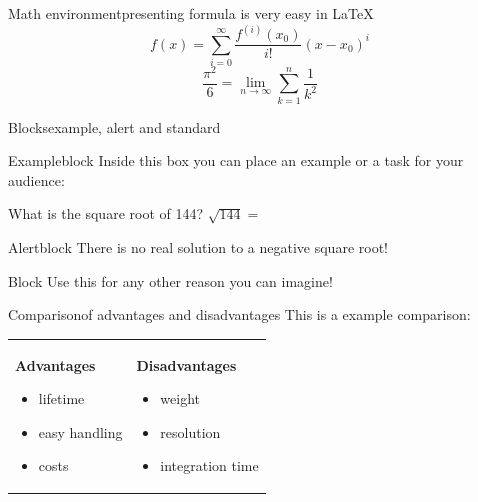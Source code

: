 \documentclass[	12pt, 				
				t,					
				aspectratio=169,
				]{beamer}
\begin{document}
	
	
	\begin{frame}{Math environment}{presenting formula is very easy in \LaTeX}
		\vfill
		\begin{equation*}
			f(x)=\sum_{i=0}^\infty \frac{f^{(i)}(x_0)}{i!}(x-x_0)^i
		\end{equation*}
		\vfill
		\begin{equation*}
			\displaystyle\frac{\pi^2}{6}=\lim_{n \to \infty}\sum_{k=1}^n \frac{1}{k^2}
		\end{equation*}
		\vfill
	\end{frame}
	
	
	\begin{frame}{Blocks}{example, alert and standard}
	    \begin{exampleblock}{Exampleblock}
			Inside this box you can place an example or a task for your audience:
			
			What is the square root of 144? $\sqrt{144} = $
		\end{exampleblock}
		\begin{alertblock}{Alertblock}			
			There is no real solution to a negative square root!
		\end{alertblock}
		\begin{block}{Block}
			Use this for any other reason you can imagine!
		\end{block}
	\end{frame}
	
	
	\begin{frame}{Comparison}{of advantages and disadvantages}
		This is a example comparison:
		\begin{center}
		\begin{tabularx}{0.8\textwidth}{X|X}
			\textbf{Advantages}
			 \begin{itemize}[<2->]
			 	\item lifetime
			 	\item easy handling
			 	\item costs
			 \end{itemize} &
			\textbf{Disadvantages}
			 \begin{itemize}[<3->]
			 	\item weight
			 	\item resolution
			 	\item integration time
			 \end{itemize}
		\end{tabularx}
		\end{center}
	\end{frame}
	
\end{document}
